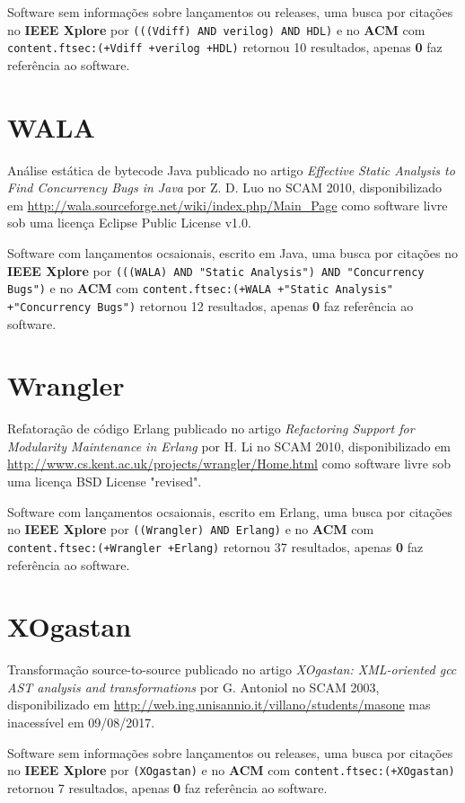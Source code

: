 Software sem informações sobre lançamentos ou releases,
uma busca por citações no {\bf IEEE Xplore} por
\texttt{(((Vdiff) AND verilog) AND HDL)}
e no {\bf ACM} com
\texttt{content.ftsec:(+Vdiff +verilog +HDL)}
retornou
10 resultados, apenas
{\bf 0} faz referência ao software.



\section{WALA}

Análise estática de bytecode Java
publicado no artigo {\it Effective Static Analysis to Find Concurrency Bugs in Java}
por Z. D. Luo
no SCAM 2010,
disponibilizado em \url{http://wala.sourceforge.net/wiki/index.php/Main_Page}
como software livre
sob uma licença Eclipse Public License v1.0.

Software com lançamentos ocsaionais,
escrito em Java,
uma busca por citações no {\bf IEEE Xplore} por
\texttt{(((WALA) AND "Static Analysis") AND "Concurrency Bugs")}
e no {\bf ACM} com
\texttt{content.ftsec:(+WALA +"Static Analysis" +"Concurrency Bugs")}
retornou
12 resultados, apenas
{\bf 0} faz referência ao software.



\section{Wrangler}

Refatoração de código Erlang
publicado no artigo {\it Refactoring Support for Modularity Maintenance in Erlang}
por H. Li
no SCAM 2010,
disponibilizado em \url{http://www.cs.kent.ac.uk/projects/wrangler/Home.html}
como software livre
sob uma licença BSD License "revised".

Software com lançamentos ocsaionais,
escrito em Erlang,
uma busca por citações no {\bf IEEE Xplore} por
\texttt{((Wrangler) AND Erlang)}
e no {\bf ACM} com
\texttt{content.ftsec:(+Wrangler +Erlang)}
retornou
37 resultados, apenas
{\bf 0} faz referência ao software.



\section{XOgastan}

Transformação source-to-source
publicado no artigo {\it XOgastan: XML-oriented gcc AST analysis and transformations}
por G. Antoniol
no SCAM 2003,
disponibilizado em \url{http://web.ing.unisannio.it/villano/students/masone}
mas inacessível em 09/08/2017.

Software sem informações sobre lançamentos ou releases,
uma busca por citações no {\bf IEEE Xplore} por
\texttt{(XOgastan)}
e no {\bf ACM} com
\texttt{content.ftsec:(+XOgastan)}
retornou
7 resultados, apenas
{\bf 0} faz referência ao software.




